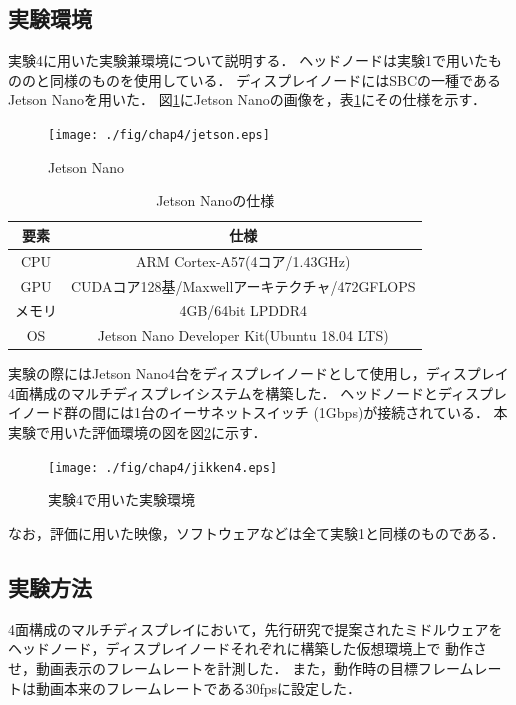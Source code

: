 \subsection*{実験環境}
実験4に用いた実験兼環境について説明する．
ヘッドノードは実験1で用いたもののと同様のものを使用している．
ディスプレイノードにはSBCの一種であるJetson Nanoを用いた．
図\ref{jetson}にJetson Nanoの画像を，表\ref{jetson_spec}にその仕様を示す．

\begin{figure}[H]
    \hspace*{\fill}
    \texttt{[image: ./fig/chap4/jetson.eps]}
    \hspace*{\fill}
    \caption{Jetson Nano}
    \label{jetson}
\end{figure}

\begin{table}[H]
    \caption{Jetson Nanoの仕様}
    \begin{center}
    \begin{tabular}{cc}
    \hline
    要素 & 仕様 \\\hline\hline
    CPU & ARM Cortex-A57(4コア/1.43GHz) \\ \hline
    GPU & CUDAコア128基/Maxwellアーキテクチャ/472GFLOPS \\ \hline
    メモリ & 4GB/64bit LPDDR4 \\ \hline
    OS & Jetson Nano Developer Kit(Ubuntu 18.04 LTS)\\ \hline
    \end{tabular}
    \label{jetson_spec}
    \end{center}
\end{table}

実験の際にはJetson Nano4台をディスプレイノードとして使用し，ディスプレイ4面構成のマルチディスプレイシステムを構築した．
ヘッドノードとディスプレイノード群の間には1台のイーサネットスイッチ (1Gbps)が接続されている．
本実験で用いた評価環境の図を図\ref{jikken4_environment}に示す．

\begin{figure}[H]
    \hspace*{\fill}
    \texttt{[image: ./fig/chap4/jikken4.eps]}
    \hspace*{\fill}
    \caption{実験4で用いた実験環境}
    \label{jikken4_environment}
\end{figure}

なお，評価に用いた映像，ソフトウェアなどは全て実験1と同様のものである．

\subsection*{実験方法}
4面構成のマルチディスプレイにおいて，先行研究で提案されたミドルウェアをヘッドノード，ディスプレイノードそれぞれに構築した仮想環境上で
動作させ，動画表示のフレームレートを計測した．
また，動作時の目標フレームレートは動画本来のフレームレートである30fpsに設定した．

